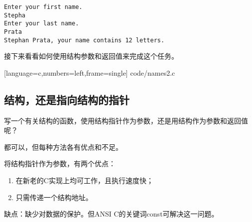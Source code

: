 \begin{frame}[fragile]\ft{\subsecname}
\begin{lstlisting}[backgroundcolor=\color{blue!20}]
Enter your first name.
Stepha
Enter your last name.
Prata
Stephan Prata, your name contains 12 letters.
\end{lstlisting}
\end{frame}

\begin{frame}[fragile]\ft{\subsecname}
  接下来看看如何使用\textcolor{acolor1}{结构参数和返回值}来完成这个任务。
\end{frame}

\begin{frame}\ft{\subsecname}
  
  [language=c,numbers=left,frame=single]  
  {code/names2.c}
\end{frame}


\subsection{结构，还是指向结构的指针}
\begin{frame}[fragile]\ft{\subsecname}
\begin{li}
写一个有关结构的函数，使用结构指针作为参数，还是用结构作为参数和返回值呢？
\end{li}  \vspace{0.1in}

都可以，但每种方法各有优点和不足。           
\end{frame}

\begin{frame}[fragile]\ft{\subsecname}
将结构指针作为参数，有两个优点：\vspace{0.1in}

\begin{enumerate}
\item 在新老的C实现上均可工作，且执行速度快；\\[0.1in]
\item 只需传递一个结构地址。\\[0.1in]
\end{enumerate}
缺点：缺少对数据的保护。但ANSI C的关键词{\tf const}可解决这一问题。
\end{frame}

